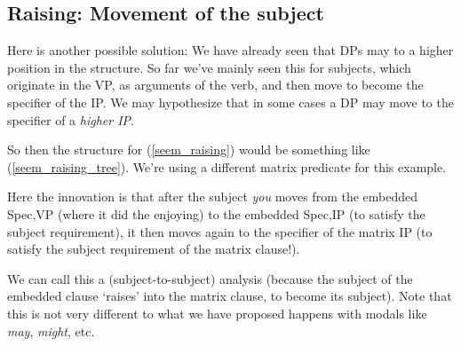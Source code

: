 \documentclass{article}
\begin{document}
\subsection{Raising: Movement of the subject}

Here is another possible solution: We have already seen that DPs may  to a higher position in the structure.
So far we've mainly seen this for subjects, which originate   in the VP, as arguments of the verb, and then move to become the specifier of the IP. 
We may hypothesize that in some cases a DP may move to the specifier of a \textit{higher IP}. 

So then the structure for (\ref{seem_raising}) would be something like (\ref{seem_raising_tree}). We're using a different matrix predicate for this example.
\begin{exe}
\end{exe}

Here the innovation is that after the subject \emph{you} moves from the embedded Spec,VP (where it did the enjoying) to the embedded Spec,IP (to satisfy the subject requirement), it then moves again to the specifier of the matrix IP (to satisfy the subject requirement of the matrix clause!).

We can call this a (subject-to-subject)  analysis (because the subject of the embedded clause `raises' into the matrix clause, to become its subject).
Note that this is not very different to what we have proposed happens with modals like \emph{may}, \emph{might}, etc.
\end{document}
